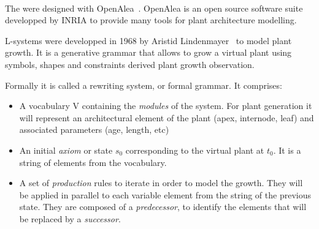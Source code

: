 
\paragraph{}


The  were designed with
OpenAlea~\cite{pradal2009plantgl}. OpenAlea is an open source software
suite developped by INRIA to provide many tools for plant architecture
modelling. 

 L-systems were developped
in 1968 by Aristid Lindenmayer~\cite{prusinkiewicz2012algorithmic}
to model plant growth.  It is a generative grammar that allows to
grow a virtual plant using symbols, shapes and constraints derived
 plant growth observation.

Formally it is called a rewriting system, or formal grammar. It
comprises:

\begin{itemize}
    \item A vocabulary V containing the \textit{modules} of the
    system. For plant generation it will represent an architectural
    element of the plant (apex, internode, leaf) and associated
    parameters (age, length, etc) \item An initial \textit{axiom}
    or state $s_0$ corresponding to the virtual plant at $t_0$. It
    is a string of elements from the vocabulary.  \item A set
    of \textit{production} rules to iterate in order to model
    the growth. They will be applied in parallel to each variable
    element from the string of the previous state. They are composed
    of a \textit{predecessor}, to identify the elements that will be
    replaced by a \textit{successor}.
\end{itemize}

